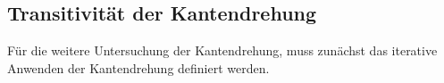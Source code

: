 \documentclass[12pt,titlepage,twoside,cleardoublepage]{article}
\theoremstyle{nummermitklammern}
\newtheorem{definition}[temp]{Definition}
\newtheorem{definition}[zahl]{Definition}
\numberwithin{equation}{section}
\begin{document}
 \subsection{Transitivität der Kantendrehung}

Für die weitere Untersuchung der Kantendrehung, muss zunächst das iterative Anwenden der Kantendrehung definiert werden.
\end{document}
